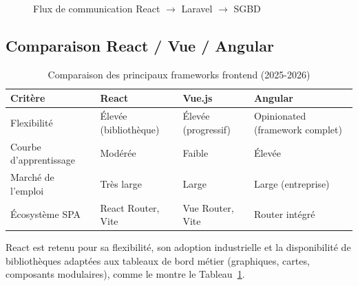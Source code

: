 \begin{figure}[H]
\centering
{}%
\caption{Flux de communication React $\rightarrow$ Laravel $\rightarrow$ SGBD}
\label{fig:react_flow}
\end{figure}

\subsection{Comparaison React / Vue / Angular}

\begin{table}[H]
\caption{Comparaison des principaux frameworks frontend (2025-2026)}
\label{tab:spa_compare}
\centering
\small
\begin{tabular}{|l|p{3.5cm}|p{3.5cm}|p{3.5cm}|}
\hline
\textbf{Critère} & \textbf{React} & \textbf{Vue.js} & \textbf{Angular} \\
\hline
Flexibilité & Élevée (bibliothèque) & Élevée (progressif) & Opinionated (framework complet) \\
\hline
Courbe d'apprentissage & Modérée & Faible & Élevée \\
\hline
Marché de l'emploi & Très large & Large & Large (entreprise) \\
\hline
Écosystème SPA & React Router, Vite & Vue Router, Vite & Router intégré \\
\hline
\end{tabular}
\end{table}

React est retenu pour sa flexibilité, son adoption industrielle et la disponibilité de
bibliothèques adaptées aux tableaux de bord métier (graphiques, cartes, composants
modulaires), comme le montre le Tableau~\ref{tab:spa_compare}.

